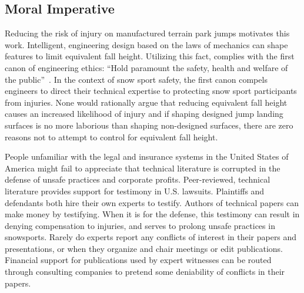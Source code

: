 \documentclass{article}
\begin{document}
\subsection{Moral Imperative}
%
Reducing the risk of injury on manufactured terrain park jumps motivates this
work. Intelligent, engineering design based on the laws of mechanics can shape
features to limit equivalent fall height. Utilizing this fact, complies with
the first canon of engineering ethics: ``Hold paramount the safety, health and
welfare of the public''~\cite{NSPE2019}. In the context of snow sport safety,
the first canon compels engineers to direct their technical expertise to
protecting snow sport participants from injuries. None would rationally argue
that reducing equivalent fall height causes an increased likelihood of
injury and if shaping designed jump landing surfaces is no more laborious than
shaping non-designed surfaces, there are zero reasons not to attempt to control
for equivalent fall height.

People unfamiliar with the legal and insurance systems in the United States of
America might fail to appreciate that technical literature is corrupted in the
defense of unsafe practices and corporate profits. Peer-reviewed, technical
literature provides support for testimony in U.S. lawsuits. Plaintiffs and
defendants both hire their own experts to testify. Authors of technical papers
can make money by testifying. When it is for the defense, this testimony can
result in denying compensation to injuries, and serves to prolong unsafe
practices in snowsports. Rarely do experts report any conflicts of interest in
their papers and presentations, or when they organize and chair meetings or
edit publications. Financial support for publications used by expert witnesses
can be routed through consulting companies to pretend some deniability of
conflicts in their papers.
\end{document}
